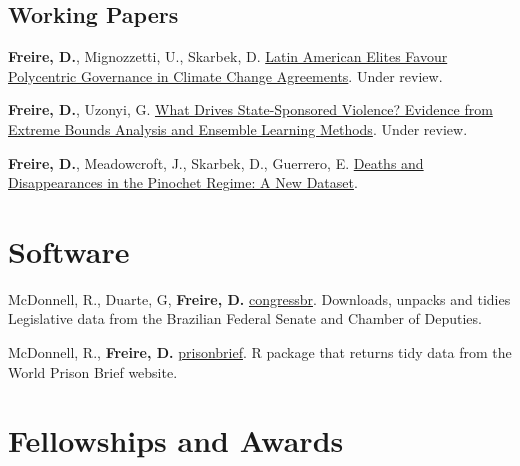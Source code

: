 \documentclass[a4paper]{article}
\renewenvironment{itemize}{
  \begin{list}{}{
    \setlength{\leftmargin}{1.5em}
  }
}{
  \end{list}
}
\begin{document}
\subsection*{Working Papers}

\begin{itemize}
	\item \textbf{Freire, D.}, Mignozzetti, U., Skarbek, D. \href{https://osf.io/9a6ch}{Latin American Elites Favour Polycentric Governance in Climate Change Agreements}. Under review.
    \item \textbf{Freire, D.}, Uzonyi, G. \href{https://osf.io/pzx3q}{What Drives State-Sponsored Violence? Evidence from Extreme Bounds Analysis and Ensemble Learning Methods}. Under review.
    \item \textbf{Freire, D.}, Meadowcroft, J., Skarbek, D., Guerrero, E.  \href{https://osf.io/rm4y8/}{Deaths and Disappearances in the Pinochet Regime: A New Dataset}. 
\end{itemize}

\section*{Software}

\begin{itemize}
	\item McDonnell, R., Duarte, G, \textbf{Freire, D.} \href{https://cran.r-project.org/package=congressbr}{congressbr}. Downloads, unpacks and tidies Legislative data from the Brazilian Federal Senate and Chamber of Deputies.
	\item McDonnell, R., \textbf{Freire, D.} \href{http://danilofreire.github.io/prisonbrief/}{prisonbrief}. R package that returns tidy data from the World Prison Brief website. 
\end{itemize}

\section*{Fellowships and Awards}
\end{document}
